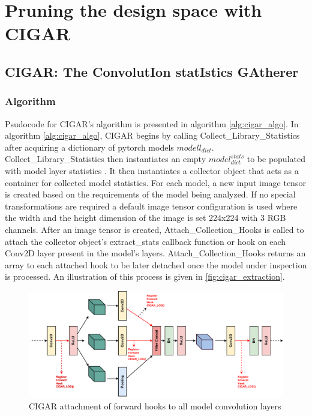 \section{Pruning the design space with CIGAR}
\label{chap:dataflow_dse:pruning}

\subsection{CIGAR: The ConvolutIon statIstics GAtherer}
\label{chap:dataflow_dse:pruning:cigar}

\subsubsection{Algorithm}
\label{chap:dataflow_dse:pruning:cigar:algo}

Psudocode for \ac{CIGAR}'s algorithm is presented in algorithm
\ref{alg:cigar_algo}. In algorithm \ref{alg:cigar_algo}, \ac{CIGAR} begins by
calling Collect\_Library\_Statistics after acquiring a dictionary of pytorch
models $modell_{dict}$. Collect\_Library\_Statistics then instantiates an empty
$model^{stats}_{dict}$ to be populated with model layer statistics . It then
instantiates a collector object that acts as a container for collected model
statistics. For each model, a new input image tensor is created based on the
requirements of the model being analyzed. If no special transformations are
required a default image tensor configuration is used where the width and the
height dimension of the image is set 224x224 with 3 RGB channels. After an image
tensor is created, Attach\_Collection\_Hooks is called to attach the collector
object's extract\_stats callback function or hook on each Conv2D layer present
in the model's layers. Attach\_Collection\_Hooks returns an array to each
attached hook to be later detached once the model under inspection is processed.
An illustration of this process is given in \autoref{fig:cigar_extraction}.

\begin{figure}
    \centering
    \includegraphics[scale=0.5]{fig/CIGAR.pdf}
    \caption{\ac{CIGAR} attachment of forward hooks to all model convolution layers}
    \label{fig:cigar_extraction}
\end{figure}

